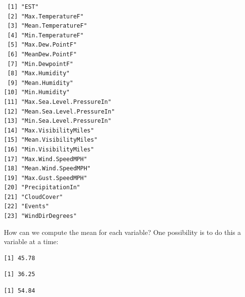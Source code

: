 \documentclass[]{krantz}
\makeatletter
\newenvironment{Shaded}{\begin{snugshade}}{\end{snugshade}}
\newcommand{\KeywordTok}[1]{\textcolor[rgb]{0.27,0.27,0.27}{\textbf{#1}}}
\newcommand{\StringTok}[1]{\textcolor[rgb]{0.5,0.5,0.5}{#1}}
\newcommand{\OperatorTok}[1]{\textcolor[rgb]{0.43,0.43,0.43}{\textbf{#1}}}
\newcommand{\NormalTok}[1]{#1}
\newenvironment{kframe}{%
\medskip{}
\setlength{\fboxsep}{.8em}
 \def\at@end@of@kframe{}%
 \ifinner\ifhmode%
  \def\at@end@of@kframe{\end{minipage}}%
  \begin{minipage}{\columnwidth}%
 \fi\fi%
 \def\FrameCommand##1{\hskip\@totalleftmargin \hskip-\fboxsep
 \colorbox{shadecolor}{##1}\hskip-\fboxsep
     \hskip-\linewidth \hskip-\@totalleftmargin \hskip\columnwidth}%
 \MakeFramed {\advance\hsize-\width
   \@totalleftmargin\z@ \linewidth\hsize
   \@setminipage}}%
 {\par\unskip\endMakeFramed%
 \at@end@of@kframe}
\renewenvironment{Shaded}{\begin{kframe}}{\end{kframe}}
\makeatother
\begin{document}
\begin{verbatim}
 [1] "EST"                      
 [2] "Max.TemperatureF"         
 [3] "Mean.TemperatureF"        
 [4] "Min.TemperatureF"         
 [5] "Max.Dew.PointF"           
 [6] "MeanDew.PointF"           
 [7] "Min.DewpointF"            
 [8] "Max.Humidity"             
 [9] "Mean.Humidity"            
[10] "Min.Humidity"             
[11] "Max.Sea.Level.PressureIn" 
[12] "Mean.Sea.Level.PressureIn"
[13] "Min.Sea.Level.PressureIn" 
[14] "Max.VisibilityMiles"      
[15] "Mean.VisibilityMiles"     
[16] "Min.VisibilityMiles"      
[17] "Max.Wind.SpeedMPH"        
[18] "Mean.Wind.SpeedMPH"       
[19] "Max.Gust.SpeedMPH"        
[20] "PrecipitationIn"          
[21] "CloudCover"               
[22] "Events"                   
[23] "WindDirDegrees"           
\end{verbatim}

How can we compute the mean for each variable? One possibility is to do
this a variable at a time:

\begin{Shaded}
\end{Shaded}

\begin{verbatim}
[1] 45.78
\end{verbatim}

\begin{Shaded}
\end{Shaded}

\begin{verbatim}
[1] 36.25
\end{verbatim}

\begin{Shaded}
\end{Shaded}

\begin{verbatim}
[1] 54.84
\end{verbatim}
\end{document}
